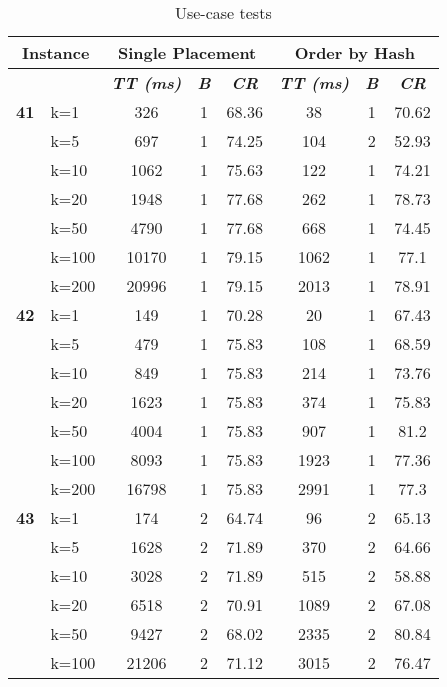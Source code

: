     \begin{table}[htbp]
    \caption{Use-case tests}
    \centering
    \begin{tabular}{|l|l|c|c|c|c|c|c|}
    
    \multicolumn{ 2}{|c|}{\textbf{Instance}} & \multicolumn{ 3}{c|}{\textbf{Single Placement}} & \multicolumn{ 3}{c|}{\textbf{Order by Hash}} \\ \hline
    \multicolumn{ 2}{|l|}{} & \textbf{\textit{TT (ms)}} & \textbf{\textit{B}} & \textbf{\textit{CR}} & \textbf{\textit{TT (ms)}} & \textbf{\textit{B}} & \textbf{\textit{CR}} \\ \hline
    \multicolumn{1}{|r|}{\textbf{41}} & k=1 & 326 & 1 & 68.36 & 38 & 1 & 70.62 \\ 
     & k=5 & 697 & 1 & 74.25 & 104 & 2 & 52.93 \\ 
     & k=10 & 1062 & 1 & 75.63 & 122 & 1 & 74.21 \\ 
     & k=20 & 1948 & 1 & 77.68 & 262 & 1 & 78.73 \\ 
     & k=50 & 4790 & 1 & 77.68 & 668 & 1 & 74.45 \\ 
     & k=100 & 10170 & 1 & 79.15 & 1062 & 1 & 77.1 \\ 
     & k=200 & 20996 & 1 & 79.15 & 2013 & 1 & 78.91 \\ \hline
    \multicolumn{1}{|r|}{\textbf{42}} & k=1 & 149 & 1 & 70.28 & 20 & 1 & 67.43 \\ 
     & k=5 & 479 & 1 & 75.83 & 108 & 1 & 68.59 \\ 
     & k=10 & 849 & 1 & 75.83 & 214 & 1 & 73.76 \\ 
     & k=20 & 1623 & 1 & 75.83 & 374 & 1 & 75.83 \\ 
     & k=50 & 4004 & 1 & 75.83 & 907 & 1 & 81.2 \\ 
     & k=100 & 8093 & 1 & 75.83 & 1923 & 1 & 77.36 \\ 
     & k=200 & 16798 & 1 & 75.83 & 2991 & 1 & 77.3 \\ \hline
    \multicolumn{1}{|r|}{\textbf{43}} & k=1 & 174 & 2 & 64.74 & 96 & 2 & 65.13 \\ 
     & k=5 & 1628 & 2 & 71.89 & 370 & 2 & 64.66 \\ 
     & k=10 & 3028 & 2 & 71.89 & 515 & 2 & 58.88 \\ 
     & k=20 & 6518 & 2 & 70.91 & 1089 & 2 & 67.08 \\ 
     & k=50 & 9427 & 2 & 68.02 & 2335 & 2 & 80.84 \\ 
     & k=100 & 21206 & 2 & 71.12 & 3015 & 2 & 76.47 \\ 

\end{tabular}
\end{table}
